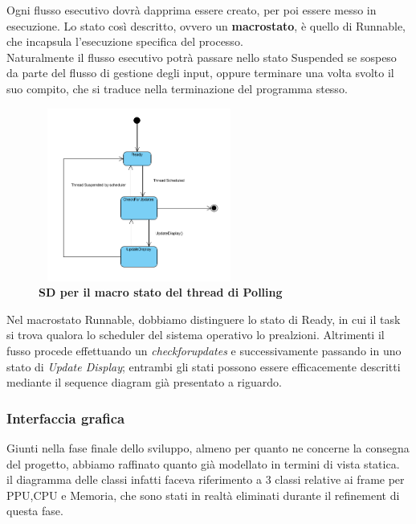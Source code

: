 \documentclass[11pt]{article}
\begin{document}
Ogni flusso esecutivo dovrà dapprima essere creato, per poi essere messo in esecuzione. Lo stato così descritto, ovvero un \textbf{macrostato}, è quello di Runnable, che incapsula l'esecuzione specifica del processo.\\ 
Naturalmente il flusso esecutivo potrà passare nello stato Suspended se sospeso da parte del flusso di gestione degli input, oppure terminare una volta svolto il suo compito, che si traduce nella terminazione del programma stesso.\\

\begin{figure}[h]
\hspace*{-1.7cm}
\centering
\includegraphics[width=250px, height=215px]{SD_CheckForUpdates.png}\\
\small\textbf{SD per il macro stato del thread di Polling}
\end{figure}

Nel macrostato Runnable, dobbiamo distinguere lo stato di Ready, in cui il task si trova qualora lo scheduler del sistema operativo lo prealzioni. Altrimenti il fusso procede effettuando un \emph{checkforupdates} e successivamente passando in uno stato di \emph{Update Display}; entrambi gli stati possono essere efficacemente descritti mediante 
il sequence diagram già presentato a riguardo.

\subsubsection{Interfaccia grafica}

Giunti nella fase finale dello sviluppo, almeno per quanto ne concerne la consegna del progetto, abbiamo raffinato quanto già modellato in termini di vista statica.\\
il diagramma delle classi infatti faceva riferimento a 3 classi relative ai frame per PPU,CPU e Memoria, che sono stati in realtà eliminati durante il refinement di questa fase.\\
\end{document}
